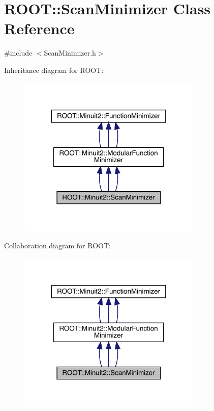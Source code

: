 \hypertarget{classROOT_1_1Minuit2_1_1ScanMinimizer}{}\section{R\+O\+OT\+:\+:Scan\+Minimizer Class Reference}
\label{classROOT_1_1Minuit2_1_1ScanMinimizer}


{\ttfamily \#include $<$Scan\+Minimizer.\+h$>$}



Inheritance diagram for R\+O\+OT\+:
\nopagebreak
\begin{figure}[H]
\begin{center}
\leavevmode
\includegraphics[width=248pt]{d9/d18/classROOT_1_1Minuit2_1_1ScanMinimizer__inherit__graph}
\end{center}
\end{figure}


Collaboration diagram for R\+O\+OT\+:
\nopagebreak
\begin{figure}[H]
\begin{center}
\leavevmode
\includegraphics[width=248pt]{db/d7a/classROOT_1_1Minuit2_1_1ScanMinimizer__coll__graph}
\end{center}
\end{figure}
